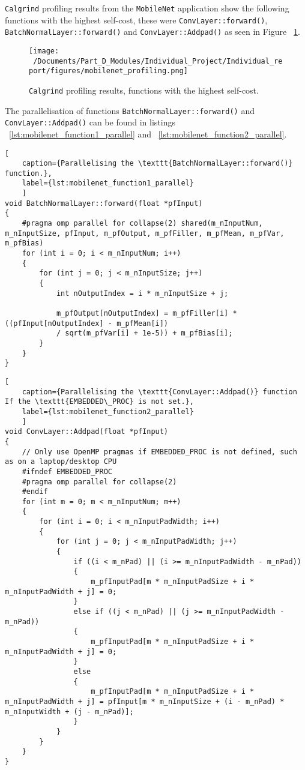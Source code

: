 \texttt{Calgrind} profiling results from the \texttt{MobileNet} application show the following functions with the highest self-cost, these were \texttt{ConvLayer::forward()}, \texttt{BatchNormalLayer::forward()} and \texttt{ConvLayer::Addpad()} as seen in Figure ~\ref{fig:mobilenet_profiling}.

\begin{figure}[H] %
	\centering
	\texttt{[image: ~/Documents/Part\_D\_Modules/Individual\_Project/Individual\_report/figures/mobilenet\_profiling.png]} %
	\caption{\texttt{Calgrind} profiling results, functions with the highest self-cost.}
	\label{fig:mobilenet_profiling} %
\end{figure}


The parallelisation of functions \texttt{BatchNormalLayer::forward()} and \texttt{ConvLayer::Addpad()} can be found in listings ~\ref{lst:mobilenet_function1_parallel} and ~\ref{lst:mobilenet_function2_parallel}.

\begin{lstlisting}[
	caption={Parallelising the \texttt{BatchNormalLayer::forward()} function.},
	label={lst:mobilenet_function1_parallel}
	]
void BatchNormalLayer::forward(float *pfInput) 
{
	#pragma omp parallel for collapse(2) shared(m_nInputNum, m_nInputSize, pfInput, m_pfOutput, m_pfFiller, m_pfMean, m_pfVar, m_pfBias) 
	for (int i = 0; i < m_nInputNum; i++)
	{
		for (int j = 0; j < m_nInputSize; j++)
		{
			int nOutputIndex = i * m_nInputSize + j;
			
			m_pfOutput[nOutputIndex] = m_pfFiller[i] * ((pfInput[nOutputIndex] - m_pfMean[i])
			/ sqrt(m_pfVar[i] + 1e-5)) + m_pfBias[i];
		}
	}
}
\end{lstlisting}


\begin{lstlisting}[
	caption={Parallelising the \texttt{ConvLayer::Addpad()} function If the \texttt{EMBEDDED\_PROC} is not set.},
	label={lst:mobilenet_function2_parallel}
	]
void ConvLayer::Addpad(float *pfInput)
{
	// Only use OpenMP pragmas if EMBEDDED_PROC is not defined, such as on a laptop/desktop CPU 
	#ifndef EMBEDDED_PROC
	#pragma omp parallel for collapse(2)
	#endif
	for (int m = 0; m < m_nInputNum; m++)
	{
		for (int i = 0; i < m_nInputPadWidth; i++)
		{
			for (int j = 0; j < m_nInputPadWidth; j++)
			{
				if ((i < m_nPad) || (i >= m_nInputPadWidth - m_nPad))
				{
					m_pfInputPad[m * m_nInputPadSize + i * m_nInputPadWidth + j] = 0;
				}
				else if ((j < m_nPad) || (j >= m_nInputPadWidth - m_nPad))
				{
					m_pfInputPad[m * m_nInputPadSize + i * m_nInputPadWidth + j] = 0;
				}
				else
				{
					m_pfInputPad[m * m_nInputPadSize + i * m_nInputPadWidth + j] = pfInput[m * m_nInputSize + (i - m_nPad) * m_nInputWidth + (j - m_nPad)];
				}
			}
		}
	}
}
\end{lstlisting}

